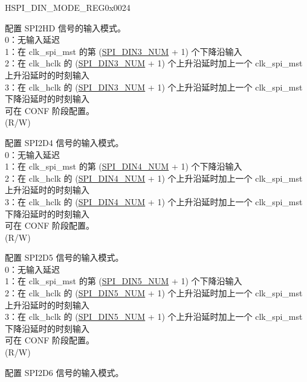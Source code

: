 \addtocounter{Regfloat}{-1}
\begin{register}{H}{SPI\_DIN\_MODE\_REG}{0x0024}
\begin{regdesc}\begin{reglist}
\item [接上页]
\label{fielddesc:SPIDIN3MODE}\item [SPI\_DIN3\_MODE] 配置 SPI2HD 信号的输入模式。\\
0：无输入延迟\\
1：在 clk\_spi\_mst 的第 (\hyperref[fielddesc:SPIDIN3NUM]{SPI\_DIN3\_NUM} + 1) 个下降沿输入\\
2：在 clk\_hclk 的 (\hyperref[fielddesc:SPIDIN3NUM]{SPI\_DIN3\_NUM} + 1) 个上升沿延时加上一个 clk\_spi\_mst 上升沿延时的时刻输入\\
3：在 clk\_hclk 的 (\hyperref[fielddesc:SPIDIN3NUM]{SPI\_DIN3\_NUM} + 1) 个上升沿延时加上一个 clk\_spi\_mst 下降沿延时的时刻输入\\
可在 CONF 阶段配置。\\
(R/W)
\label{fielddesc:SPIDIN4MODE}\item [SPI\_DIN4\_MODE] 配置 SPI2D4 信号的输入模式。\\
0：无输入延迟\\
1：在 clk\_spi\_mst 的第 (\hyperref[fielddesc:SPIDIN4NUM]{SPI\_DIN4\_NUM} + 1) 个下降沿输入\\
2：在 clk\_hclk 的 (\hyperref[fielddesc:SPIDIN4NUM]{SPI\_DIN4\_NUM} + 1) 个上升沿延时加上一个 clk\_spi\_mst 上升沿延时的时刻输入\\
3：在 clk\_hclk 的 (\hyperref[fielddesc:SPIDIN4NUM]{SPI\_DIN4\_NUM} + 1) 个上升沿延时加上一个 clk\_spi\_mst 下降沿延时的时刻输入\\
可在 CONF 阶段配置。\\
(R/W)
\label{fielddesc:SPIDIN5MODE}\item [SPI\_DIN5\_MODE] 配置 SPI2D5 信号的输入模式。\\
0：无输入延迟\\
1：在 clk\_spi\_mst 的第 (\hyperref[fielddesc:SPIDIN5NUM]{SPI\_DIN5\_NUM} + 1) 个下降沿输入\\
2：在 clk\_hclk 的 (\hyperref[fielddesc:SPIDIN5NUM]{SPI\_DIN5\_NUM} + 1) 个上升沿延时加上一个 clk\_spi\_mst 上升沿延时的时刻输入\\
3：在 clk\_hclk 的 (\hyperref[fielddesc:SPIDIN5NUM]{SPI\_DIN5\_NUM} + 1) 个上升沿延时加上一个 clk\_spi\_mst 下降沿延时的时刻输入\\
可在 CONF 阶段配置。\\
(R/W)
\label{fielddesc:SPIDIN6MODE}\item [SPI\_DIN6\_MODE] 配置 SPI2D6 信号的输入模式。\\

\end{reglist}
\end{regdesc}
\end{register}

